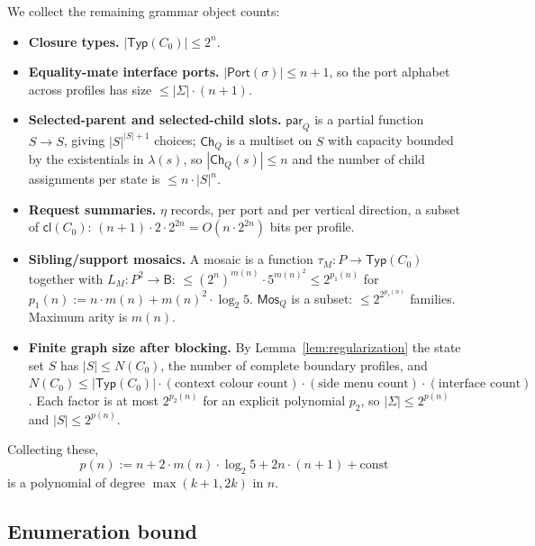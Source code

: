 \documentclass[11pt]{article}
\newcommand{\Base}{\mathsf{B}}
\newcommand{\Cl}{\mathsf{cl}}
\newcommand{\Typ}{\mathsf{Typ}}
\newcommand{\Mos}{\mathsf{Mos}}
\newcommand{\parr}{\mathsf{par}}
\newcommand{\Port}{\mathsf{Port}}
\begin{document}
We collect the remaining grammar object counts:
\begin{itemize}[leftmargin=2em]
  \item \textbf{Closure types.}  $|\Typ(C_0)|\le 2^n$.
  \item \textbf{Equality-mate interface ports.}
    $|\Port(\sigma)|\le n+1$, so the port alphabet across profiles
    has size $\le|\Sigma|\cdot(n+1)$.
  \item \textbf{Selected-parent and selected-child slots.}  $\parr_Q$
    is a partial function $S\to S$, giving $|S|^{|S|+1}$ choices;
    $\mathsf{Ch}_Q$ is a multiset on $S$ with capacity bounded by the
    existentials in $\lambda(s)$, so $|\mathsf{Ch}_Q(s)|\le n$ and
    the number of child assignments per state is $\le n\cdot|S|^n$.
  \item \textbf{Request summaries.}  $\eta$ records, per port and
    per vertical direction, a subset of $\Cl(C_0)$:
    $(n+1)\cdot 2\cdot 2^{2n}=O(n\cdot 2^{2n})$ bits per profile.
  \item \textbf{Sibling/support mosaics.}  A mosaic is a function
    $\tau_M:P\to\Typ(C_0)$ together with $L_M:P^2\to\Base$:
    $\le(2^n)^{m(n)}\cdot 5^{m(n)^2}\le 2^{p_1(n)}$ for
    $p_1(n):=n\cdot m(n)+m(n)^2\cdot\log_2 5$.  $\Mos_Q$ is a subset:
    $\le 2^{2^{p_1(n)}}$ families.  Maximum arity is $m(n)$.
  \item \textbf{Finite graph size after blocking.}  By
    Lemma~\ref{lem:regularization} the state set $S$ has
    $|S|\le N(C_0)$, the number of complete boundary profiles, and
    $N(C_0)\le|\Typ(C_0)|\cdot(\text{context colour count})\cdot
    (\text{side menu count})\cdot(\text{interface count})$.  Each
    factor is at most $2^{p_2(n)}$ for an explicit polynomial $p_2$,
    so $|\Sigma|\le 2^{p(n)}$ and $|S|\le 2^{p(n)}$.
\end{itemize}
Collecting these,
\[
  p(n):=n+2\cdot m(n)\cdot\log_2 5+2n\cdot(n+1)+\text{const}
\]
is a polynomial of degree $\max(k+1,2k)$ in $n$.

\subsection{Enumeration bound}
\label{ssec:enumeration}
\end{document}

